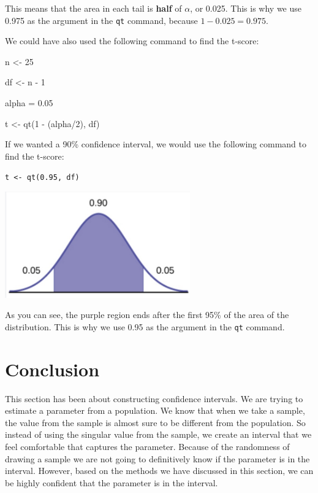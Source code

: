 \documentclass[
  letterpaper,
  DIV=11,
  numbers=noendperiod]{scrreprt}
\newenvironment{Shaded}{\begin{snugshade}}{\end{snugshade}}
\newcommand{\DecValTok}[1]{\textcolor[rgb]{0.68,0.00,0.00}{#1}}
\newcommand{\FloatTok}[1]{\textcolor[rgb]{0.68,0.00,0.00}{#1}}
\newcommand{\FunctionTok}[1]{\textcolor[rgb]{0.28,0.35,0.67}{#1}}
\newcommand{\NormalTok}[1]{\textcolor[rgb]{0.00,0.23,0.31}{#1}}
\newcommand{\OtherTok}[1]{\textcolor[rgb]{0.00,0.23,0.31}{#1}}
\newcommand{\SpecialCharTok}[1]{\textcolor[rgb]{0.37,0.37,0.37}{#1}}
\begin{document}
This means that the area in each tail is \textbf{half} of \(\alpha\), or
0.025. This is why we use 0.975 as the argument in the \texttt{qt}
command, because \(1 - 0.025 = 0.975\).

We could have also used the following command to find the t-score:

\begin{Shaded}
\begin{Highlighting}[]
\NormalTok{n }\OtherTok{\textless{}{-}} \DecValTok{25}

\NormalTok{df }\OtherTok{\textless{}{-}}\NormalTok{ n }\SpecialCharTok{{-}} \DecValTok{1}

\NormalTok{alpha }\OtherTok{=} \FloatTok{0.05}

\NormalTok{t }\OtherTok{\textless{}{-}} \FunctionTok{qt}\NormalTok{(}\DecValTok{1} \SpecialCharTok{{-}}\NormalTok{ (alpha}\SpecialCharTok{/}\DecValTok{2}\NormalTok{), df)}
\end{Highlighting}
\end{Shaded}

If we wanted a 90\% confidence interval, we would use the following
command to find the t-score:

\texttt{t\ \textless{}-\ qt(0.95,\ df)}

\includegraphics[width=0.6\textwidth,height=\textheight]{./images/EPCI_10.jpg}

As you can see, the purple region ends after the first 95\% of the area
of the distribution. This is why we use 0.95 as the argument in the
\texttt{qt} command.

\section*{Conclusion}\label{conclusion-8}


This section has been about constructing confidence intervals. We are
trying to estimate a parameter from a population. We know that when we
take a sample, the value from the sample is almost sure to be different
from the population. So instead of using the singular value from the
sample, we create an interval that we feel comfortable that captures the
parameter. Because of the randomness of drawing a sample we are not
going to definitively know if the parameter is in the interval. However,
based on the methods we have discussed in this section, we can be highly
confident that the parameter is in the interval.
\end{document}
